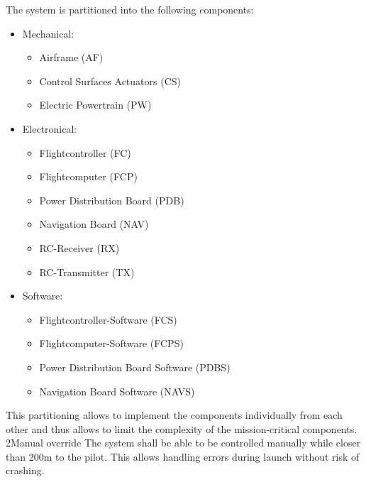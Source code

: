     {
        The system is partitioned into the following components:
        \begin{itemize}
            \item Mechanical:
                \begin{itemize}
                    \item Airframe (AF)
                    \item Control Surfaces Actuators (CS) 
                    \item Electric Powertrain (PW)
                \end{itemize}
            \item Electronical:
                \begin{itemize}
                    \item Flightcontroller (FC)
                    \item Flightcomputer (FCP)
                    \item Power Distribution Board (PDB)
                    \item Navigation Board (NAV)
                    \item RC-Receiver (RX)
                    \item RC-Transmitter (TX)
                \end{itemize}
            \item Software:
                \begin{itemize}
                    \item Flightcontroller-Software (FCS)
                    \item Flightcomputer-Software (FCPS)
                    \item Power Distribution Board Software (PDBS)
                    \item Navigation Board Software (NAVS)
                \end{itemize}
        \end{itemize}
    }
    {
        This partitioning allows to implement the components
        individually from each other and thus allows to limit the complexity
        of the mission-critical components.
    }
\dd
    {2}{Manual override}
    {
        The system shall be able to be controlled manually
        while closer than 200m to the pilot.
    }
    {
        This allows handling errors during launch without
        risk of crashing.
    }